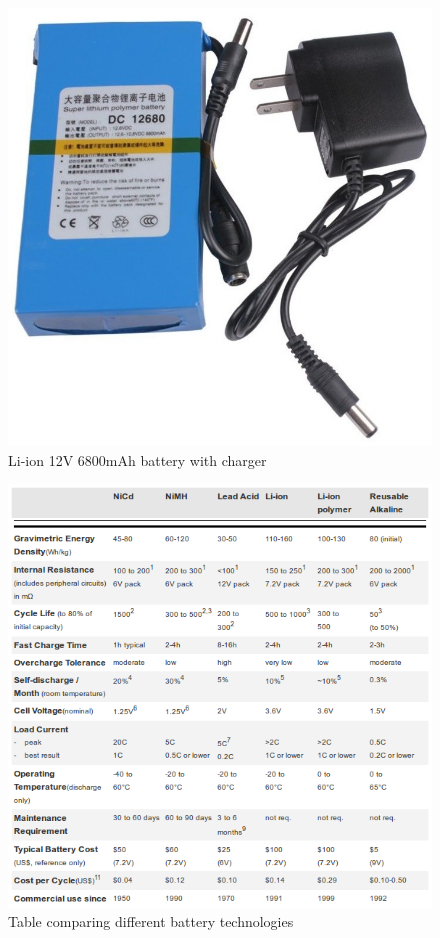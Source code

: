 		\begin{figure}[H]
				\centering
				\includegraphics[scale=0.25]{images/ProjectComponents/battery.jpg}
				\caption{Li-ion 12V 6800mAh battery with charger}
				\label{}
		\end{figure}
		\bigskip

		\begin{figure}[H]
				\centering
				\includegraphics[scale=0.75]{images/ProjectComponents/battery-differences.png}
				\caption{Table comparing different battery technologies}
				\label{}
		\end{figure}
		\bigskip

